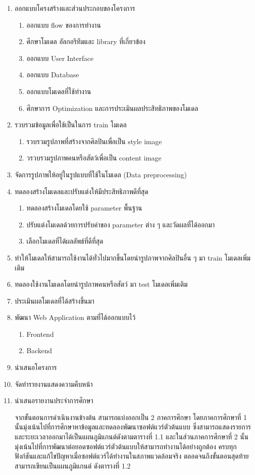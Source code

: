 \documentclass[12pt,oneside,openright,a4paper]{cpe-thai-project}
\begin{document}
\begin{enumerate}
  \item ออกแบบโครงสร้างและส่วนประกอบของโครงการ
  \begin{enumerate}
    \item ออกแบบ flow ของการทำงาน
    \item ศึกษาโมเดล อัลกอริทึมและ library ที่เกี่ยวข้อง
    \item ออกแบบ User Interface
    \item ออกแบบ Database
    \item ออกแบบโมเดลที่ใช้ทำงาน
    \item ศึกษาการ Optimization และการประเมินผลประสิทธิภาพของโมเดล
  \end{enumerate}
  \item รวบรวมข้อมูลเพื่อใช้เป็นในการ train โมเดล
  \begin{enumerate}
    \item รวบรวมรูปภาพที่สร้างจากศิลปินเพื่อเป็น style image
    \item วรวบรวมรูปภาพคนหรือสัตว์เพื่อเป็น content image
  \end{enumerate}
  \item จัดการรูปภาพให้อยู่ในรูปแบบที่ใช้ในโมเดล (Data preprocessing)
  \item ทดลองสร้างโมเดลและปรับแต่งให้มีประสิทธิภาพดีที่สุด
  \begin{enumerate}
    \item ทดลองสร้างโมเดลโดยใช้ parameter พื้นฐาน
    \item ปรับแต่งโมเดลด้วยการปรับค่าของ parameter ต่าง ๆ และวัดผลที่ได้ออกมา
    \item เลือกโมเดลที่ได้ผลลัพธ์ที่ดีที่สุด
  \end{enumerate}
  \item ทำให้โมเดลให้สามารถใช้งานได้ทั่วไปมากขึ้นโดยนำรูปภาพจากศิลปินอื่น ๆ มา train โมเดลเพิ่มเติม
  \item ทดลองใช้งานโมเดลโดยนำรูปภาพคนหรือสัตว์ มา test โมเดลเพิ่มเติม
  \item ประเมินผลโมเดลที่ได้สร้างขึ้นมา
  \item พัฒนา Web Application ตามที่ได้ออกแบบไว้
  \begin{enumerate}
    \item Frontend
    \item Backend
  \end{enumerate}
  \item นำเสนอโครงการ
  \item จัดทำรายงานแสดงความคืบหน้า
  \item นำเสนอรายงานประจำการศึกษา 
  \par\setlength{\parindent}{5ex}
  จากขั้นตอนการดำเนินงานข้างต้น สามารถแบ่งออกเป็น 2 ภาคการศึกษา โดยภาคการศึกษาที่ 1 นั้นมุ่งเน้นไปที่การศึกษาหาข้อมูลและทดลองพัฒนาซอฟต์แวร์ตัวต้นแบบ ซึ่งสามารถแสดงรายการและระยะเวลาออกมาได้เป็นแผนภูมิแกนต์ดังตามตารางที่ 1.1 และในส่วนภาคการศึกษาที่ 2 นั้นมุ่งเน้นไปที่การพัฒนาต่อยอดซอฟต์แวร์ตัวต้นแบบให้สามารถทำงานได้อย่างถูกต้อง ครบทุกฟังก์ชันและแก้ไขปัญหาเมื่อซอฟต์แวร์ได้ทำงานในสภาพแวดล้อมจริง ตลอดจนถึงขั้นตอนสุดท้ายสามารถเขียนเป็นแผนภูมิแกนต์
  ดังตารางที่ 1.2
\end{enumerate}
\end{document}

